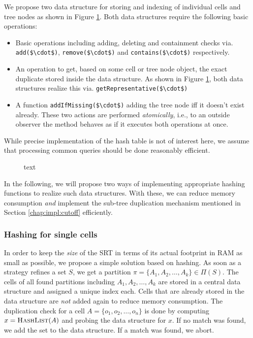 		We propose two data structure for storing and indexing of individual cells and tree nodes as shown in Figure \ref{fig:impl:hashing:datastruct}.
		Both data structures require the following basic operations:

		\begin{itemize}
			\item Basic operations including adding, deleting and containment checks via. \lstinline[mathescape]|add($\cdot$)|, \lstinline[mathescape]|remove($\cdot$)| and \lstinline[mathescape]|contains($\cdot$)| respectively.
			\item An operation to get, based on some cell or tree node object, the exact duplicate stored inside the data structure. As shown in Figure \ref{fig:impl:hashing:datastruct}, both data structures realize this via. \lstinline[mathescape]|getRepresentative($\cdot$)|
			\item A function \lstinline[mathescape]|addIfMissing($\cdot$)| adding the tree node iff it doesn't exist already. These two actions are performed \textit{atomically}, i.e., to an outside observer the method behaves as if it executes both operations at once.
		\end{itemize}

		While precise implementation of the hash table is not of interest here, we assume that processing common queries should be done reasonably efficient.

		\begin{figure}[ht!]
			\centering
			
			\caption{text}
			\label{fig:impl:hashing:datastruct}
		\end{figure}

		In the following, we will propose two ways of implementing appropriate hashing functions to realize such data structures.
		With these, we can reduce memory consumption \textit{and} implement the sub-tree duplication mechanism mentioned in Section \ref{chap:impl:cutoff} efficiently.

		\subsubsection{Hashing for single cells}

		In order to keep the \textit{size} of the \ac{SRT} in terms of its actual footprint in RAM as small as possible, we propose a simple solution based on hashing.
		As soon as a strategy refines a set $S$, we get a partition $\pi = \{ A_1, A_2, \ldots, A_k \}\in \Pi(S)$.
		The cells of all found partitions including $A_1, A_2, \ldots, A_k$ are stored in a central data structure and assigned a unique index each.
		Cells that are already stored in the data structure are \textit{not} added again to reduce memory consumption.
		The duplication check for a cell $A = \{ o_1, o_2, \ldots, o_n \}$ is done by computing $x = \Call{HashList}{A}$ and probing the data structure for $x$.
		If no match was found, we add the set to the data structure.
		If a match was found, we abort.

